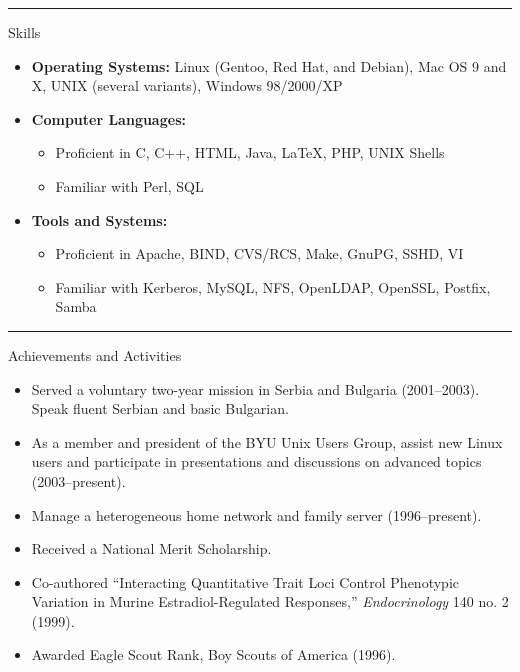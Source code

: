 \documentclass[11pt,oneside]{article}
\newenvironment{ressection}[1]{
	\rule{\textwidth}{0.25pt}	\vspace{4pt}
	{\fontfamily{phv}\selectfont\Large#1}
	\begin{itemize}
	\vspace{3pt}
}{
	\end{itemize}
}
\newcommand{\resitem}[1]{
	\vspace{-4pt}
	\item \begin{flushleft} #1 \end{flushleft}
}
\newcommand{\ressubitem}[1]{
	\vspace{-1pt}
	\item \begin{flushleft} #1 \end{flushleft}
}
\newenvironment{reslist}[1]{
	\resitem{\textbf{#1}}
	\vspace{-5pt}
	\begin{itemize}
}{
	\end{itemize}
}
\begin{document}
\begin{ressection}{Skills}

	\resitem{\textbf{Operating Systems:} Linux (Gentoo, Red Hat, and Debian), Mac OS 9 and X, UNIX (several variants), Windows 98/2000/XP}

	\begin{reslist}{Computer Languages:}

		\ressubitem{Proficient in C, C++, HTML, Java, \LaTeX, PHP, UNIX Shells}

		\ressubitem{Familiar with Perl, SQL}

	\end{reslist}

	\begin{reslist}{Tools and Systems:}

		\ressubitem{Proficient in Apache, BIND, CVS/RCS, Make, GnuPG, SSHD, VI}

		\ressubitem{Familiar with Kerberos, MySQL, NFS, OpenLDAP, OpenSSL, Postfix, Samba}

	\end{reslist}


\end{ressection}


\begin{ressection}{Achievements and Activities}

	\resitem{Served a voluntary two-year mission in Serbia and Bulgaria (2001--2003).  Speak fluent Serbian and basic Bulgarian.}

	\resitem{As a member and president of the BYU Unix Users Group, assist new Linux users and participate in presentations and discussions on advanced topics (2003--present).}

	\resitem{Manage a heterogeneous home network and family server (1996--present).}

	\resitem{Received a National Merit Scholarship.}

	\resitem{Co-authored ``Interacting Quantitative Trait Loci Control Phenotypic Variation in Murine Estradiol-Regulated Responses,'' \textit{Endocrinology} 140 no. 2 (1999).}

	\resitem{Awarded Eagle Scout Rank, Boy Scouts of America (1996).}


\end{ressection}
\end{document}
